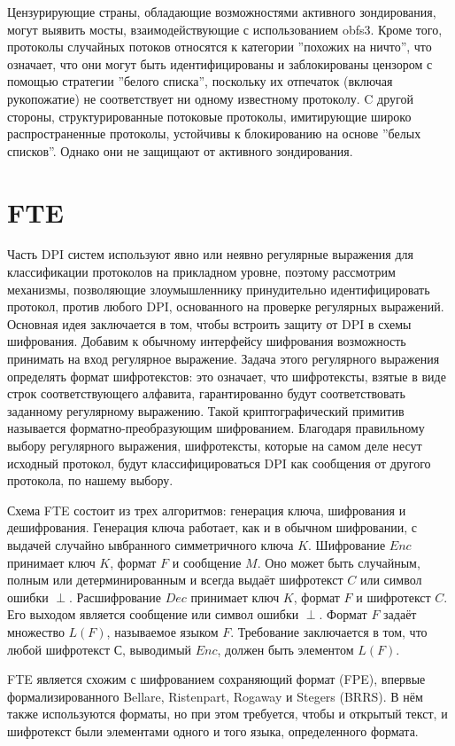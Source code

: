 Цензурирующие страны, обладающие возможностями активного зондирования, могут выявить мосты, взаимодействующие с использованием obfs3.
Кроме того, протоколы случайных потоков относятся к категории ''похожих на ничто'', что означает,
что они могут быть идентифицированы и заблокированы цензором с помощью стратегии ''белого списка'',
поскольку их отпечаток (включая рукопожатие) не соответствует ни одному известному протоколу.
C другой стороны, структурированные потоковые протоколы, имитирующие широко распространенные протоколы,
устойчивы к блокированию на основе ''белых списков''. Однако они не защищают от активного зондирования.

\section{FTE}

Часть DPI систем используют явно или неявно регулярные выражения для классификации протоколов на прикладном уровне,
поэтому рассмотрим механизмы, позволяющие злоумышленнику принудительно идентифицировать протокол, против любого DPI, основанного на проверке регулярных выражений.
Основная идея заключается в том, чтобы встроить защиту от DPI в схемы шифрования.
Добавим к обычному интерфейсу шифрования возможность принимать на вход регулярное выражение.
Задача этого регулярного выражения определять формат шифротекстов: это означает,
что шифротексты, взятые в виде строк соответствующего алфавита, гарантированно будут соответствовать заданному регулярному выражению.
Такой криптографический примитив называется форматно-преобразующим шифрованием.
Благодаря правильному выбору регулярного выражения, шифротексты, которые на самом деле несут исходный протокол,
будут классифицироваться DPI как сообщения от другого протокола, по нашему выбору.

Схема FTE состоит из трех алгоритмов: генерация ключа, шифрования и дешифрования.
Генерация ключа работает, как и в обычном шифровании, с выдачей случайно ывбранного симметричного ключа $K$.
Шифрование $Enc$ принимает ключ $K$, формат $F$ и сообщение $M$.
Оно может быть случайным, полным или детерминированным и всегда выдаёт шифротекст $C$ или символ ошибки $\perp$.
Расшифрование $Dec$ принимает ключ $K$, формат $F$ и шифротекст $C$. Его выходом является сообщение или символ ошибки $\perp$.
Формат $F$ задаёт множество $L(F)$, называемое языком $F$.
Требование заключается в том, что любой шифротекст $С$, выводимый $Enc$, должен быть элементом $L(F)$.

FTE является схожим с шифрованием сохраняющий формат (FPE), впервые формализированного Bellare, Ristenpart, Rogaway и Stegers (BRRS).
В нём также используются форматы, но при этом требуется, чтобы и открытый текст, и шифротекст были элементами одного и того языка, определенного формата.

